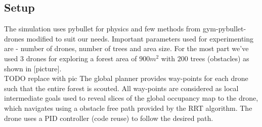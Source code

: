 \subsection{Setup}
The simulation uses pybullet for physics and few methods from gym-pybullet-drones modified to suit our needs. Important parameters used for experimenting are - number of drones, number of trees and area size. For the most part we've used $3$ drones for exploring a forest area of $900m^2$ with $200$ trees (obstacles) as shown in [picture]. \\
TODO replace with pic
The global planner provides way-points for each drone such that the entire forest is scouted. All way-points are considered as local intermediate goals used to reveal slices of the global occupancy map to the drone, which navigates using a obstacle free path provided by the RRT algorithm. The drone uses a PID controller (code reuse) to follow the desired path.\\
